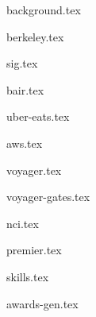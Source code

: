 \documentclass[11pt]{article}
\begin{document}
{background.tex}


{berkeley.tex}


{sig.tex}

{bair.tex}

{uber-eats.tex}

{aws.tex}

{voyager.tex}

{voyager-gates.tex}

{nci.tex}

{premier.tex}


{skills.tex}


{awards-gen.tex}
\end{document}
